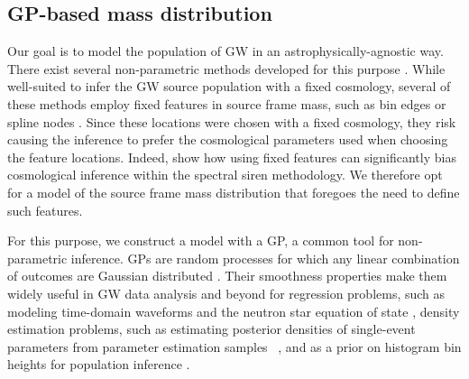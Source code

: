 \documentclass[]{aastex631}
\begin{document}
\subsection{\Acl{GP}-based mass distribution}
\label{sec:model}

Our goal is to model the population of \ac{GW} in an astrophysically-agnostic way. 
There exist several non-parametric methods developed for this purpose \citep{tiwari_vamana_2021,edelman_aint_2022,sadiq_flexible_2022,edelman_cover_2023,mandel_extracting_2019,ray_non-parametric_2023}.
While well-suited to infer the \ac{GW} source population with a fixed cosmology, several of these methods employ fixed features in source frame mass, such as bin edges \citep{mandel_extracting_2019,ray_non-parametric_2023} or spline nodes \citep{edelman_aint_2022}.
Since these locations were chosen with a fixed cosmology, they risk causing the inference to prefer the cosmological parameters used when choosing the feature locations. 
Indeed, \citet{mastrogiovanni_importance_2021} show how using fixed features can significantly bias cosmological inference within the spectral siren methodology.
We therefore opt for a model of the source frame mass distribution that foregoes the need to define such features.

For this purpose, we construct a model with a \acf{GP}, a common tool for non-parametric inference. 
\Acp{GP} are random processes for which any linear combination of outcomes are Gaussian distributed \citep{rasmussen_gaussian_2006}.
Their smoothness properties make them widely useful in \ac{GW} data analysis and beyond for regression problems, such as modeling time-domain waveforms \citep{doctor_statistical_2017, huerta_eccentric_2018} and the neutron star equation of state \citep{landry_nonparametric_2019}, density estimation problems, such as estimating posterior densities of single-event parameters from parameter estimation samples ~\citep{demilio_density_2021}, and as a prior on histogram bin heights for population inference \citep{mandel_model-independent_2017, li_flexible_2021, ray_non-parametric_2023}.
\end{document}
